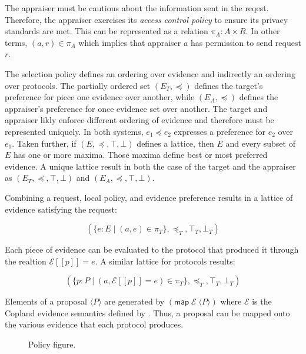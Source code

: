 \documentclass[sigconf,authordraft]{acmart}
\begin{document}
The appraiser must be cautious about the information sent in the reqest. Therefore, the appraiser exercises its \emph{access control policy} to ensure its privacy standards are met. This can be represented as a relation  $\pi_A : A\times R$. In other terms, $(a,r)\in\pi_A$ which implies that appraiser $a$ has permission to send request $r$. 

The selection policy defines an ordering over evidence and
indirectly an ordering over protocols. The partially ordered set
$(E_T,\preceq)$ defines the target's preference for piece one evidence
over another, while $(E_A,\preceq)$ defines the appraiser's preference for once evidence set over another. The target and appraiser likly enforce different ordering of evidence and therefore must be represented uniquely. In both systems, $e_1\preceq e_2$ expresses a preference for $e_2$ over
$e_1$.  Taken further, if $(E,\preceq,\top,\bot)$ defines a lattice,
then $E$ and every subset of $E$ has one or more maxima.  Those maxima
define best or most preferred evidence. A unique lattice result in both the case of the target and the appraiser as $(E_T,\preceq,\top,\bot)$ and $(E_A,\preceq,\top,\bot)$.

Combining a request, local policy, and evidence preference results in
a lattice of evidence satisfying the request:

\[(\{e:E\mid (a,e)\in\pi_T\},\preceq_T,\top_T,\bot_T)\]

Each piece of evidence can be evaluated to the protocol that produced it through the realtion $\mathcal{E}[\![p]\!]=e$. A similar lattice for protocols results:

\[(\{p:P\mid
  (a,\mathcal{E}[\![p]\!]=e)\in\pi_T\},\preceq_T,\top_T,\bot_T)\]


Elements of a proposal $\langle P\rangle$ are generated by
$(\mathsf{map}\; \mathcal{E}\; \langle P\rangle)$ where $\mathcal{E}$
is the Copland evidence semantics defined by \citet{Ramsdell:2019aa}.
Thus, a proposal can be mapped onto the various evidence that each
protocol produces.

\begin{figure}[hbtp]
  \centering 
  \caption[Attestation process]{Policy figure.}
  \label{fig:policy-fig-embed}
\end{figure}
\end{document}
